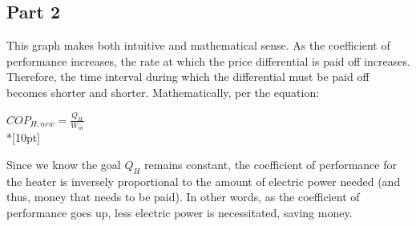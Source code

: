 \documentclass{article}
\begin{document}
\subsection{Part 2}
This graph makes both intuitive and mathematical sense. As the coefficient of performance increases, the rate at which the price differential is paid off increases. Therefore, the time interval during which the differential must be paid off becomes shorter and shorter. Mathematically, per the equation:
\begin{center}
    \(\displaystyle COP_{H, new} = \frac{Q_H}{W_{in}}\)\\*[10pt]
\end{center}
Since we know the goal \(Q_H\) remains constant, the coefficient of performance for the heater is inversely proportional to the amount of electric power needed (and thus, money that needs to be paid). In other words, as the coefficient of performance goes up, less electric power is necessitated, saving money.
\end{document}
